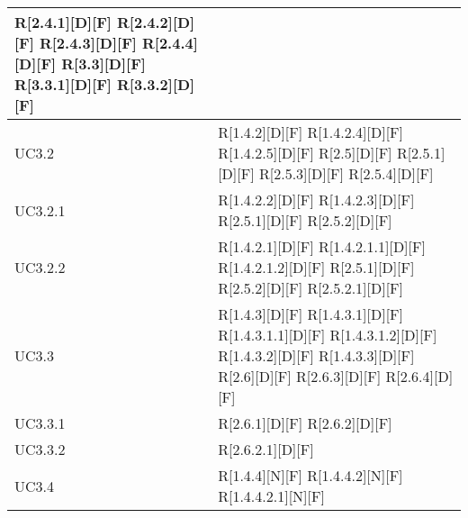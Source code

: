 \begin{longtable}{X | X}
R[2.4.1][D][F] \newline
R[2.4.2][D][F] \newline
R[2.4.3][D][F] \newline
R[2.4.4][D][F] \newline
R[3.3][D][F] \newline
R[3.3.1][D][F] \newline
R[3.3.2][D][F]  \\
\hline
UC3.2 & R[1.4.2][D][F] \newline
R[1.4.2.4][D][F] \newline
R[1.4.2.5][D][F] \newline
R[2.5][D][F] \newline
R[2.5.1][D][F] \newline
R[2.5.3][D][F] \newline
R[2.5.4][D][F]  \\
\hline
UC3.2.1 & R[1.4.2.2][D][F] \newline
R[1.4.2.3][D][F] \newline
R[2.5.1][D][F] \newline
R[2.5.2][D][F]  \\
\hline
UC3.2.2 & R[1.4.2.1][D][F] \newline
R[1.4.2.1.1][D][F] \newline
R[1.4.2.1.2][D][F] \newline
R[2.5.1][D][F] \newline
R[2.5.2][D][F] \newline
R[2.5.2.1][D][F]  \\
\hline
UC3.3 & R[1.4.3][D][F] \newline
R[1.4.3.1][D][F] \newline
R[1.4.3.1.1][D][F] \newline
R[1.4.3.1.2][D][F] \newline
R[1.4.3.2][D][F] \newline
R[1.4.3.3][D][F] \newline
R[2.6][D][F] \newline
R[2.6.3][D][F] \newline
R[2.6.4][D][F]  \\
\hline
UC3.3.1 & R[2.6.1][D][F] \newline
R[2.6.2][D][F]  \\
\hline
UC3.3.2 & R[2.6.2.1][D][F]  \\
\hline
UC3.4 & R[1.4.4][N][F] \newline
R[1.4.4.2][N][F] \newline
R[1.4.4.2.1][N][F] \newline

\end{longtable}
